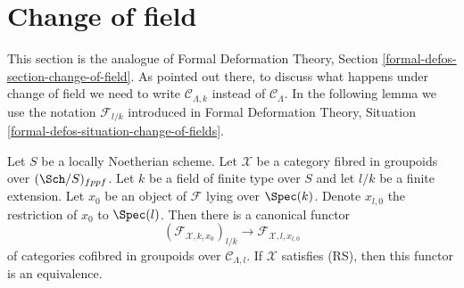 \section{Change of field}
\label{section-change-of-field}

\noindent
This section is the analogue of
Formal Deformation Theory, Section \ref{formal-defos-section-change-of-field}.
As pointed out there, to discuss what happens under change of field
we need to write $\mathcal{C}_{\Lambda, k}$ instead of $\mathcal{C}_\Lambda$.
In the following lemma we use the notation $\mathcal{F}_{l/k}$
introduced in Formal Deformation Theory, Situation
\ref{formal-defos-situation-change-of-fields}.

\begin{lemma}
\label{lemma-change-of-field}
Let $S$ be a locally Noetherian scheme. Let $\mathcal{X}$ be a category
fibred in groupoids over $(\Sch/S)_{fppf}$. Let $k$ be a
field of finite type over $S$ and let $l/k$ be a finite extension.
Let $x_0$ be an object of $\mathcal{F}$ lying over $\Spec(k)$.
Denote $x_{l, 0}$ the restriction of $x_0$ to $\Spec(l)$.
Then there is a canonical functor
$$
(\mathcal{F}_{\mathcal{X}, k , x_0})_{l/k}
\longrightarrow
\mathcal{F}_{\mathcal{X}, l, x_{l, 0}}
$$
of categories cofibred in groupoids over $\mathcal{C}_{\Lambda, l}$.
If $\mathcal{X}$ satisfies (RS), then this functor is an equivalence.
\end{lemma}

